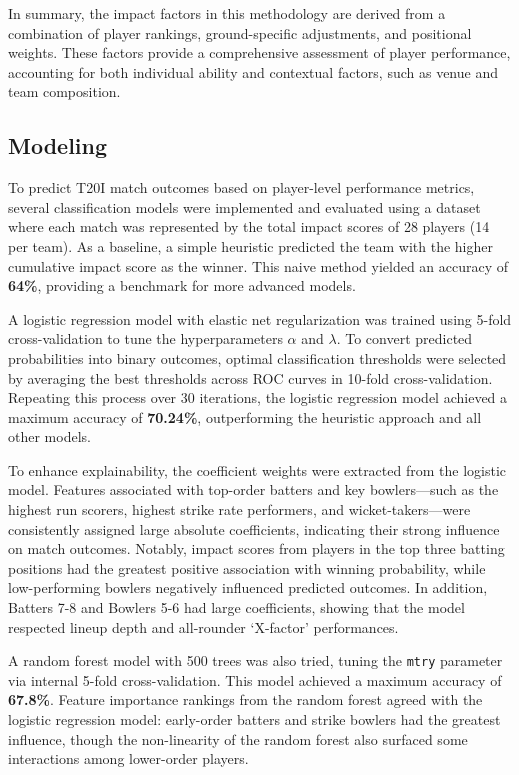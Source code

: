 \documentclass{article}[12pt]
\begin{document}
In summary, the impact factors in this methodology are derived from a combination of player rankings, ground-specific adjustments, and positional weights. These factors provide a comprehensive assessment of player performance, accounting for both individual ability and contextual factors, such as venue and team composition.

\subsection{Modeling}

To predict T20I match outcomes based on player-level performance metrics, several classification models were implemented and evaluated using a dataset where each match was represented by the total impact scores of 28 players (14 per team). As a baseline, a simple heuristic predicted the team with the higher cumulative impact score as the winner. This naive method yielded an accuracy of \textbf{64\%}, providing a benchmark for more advanced models.

A logistic regression model with elastic net regularization was trained using 5-fold cross-validation to tune the hyperparameters $\alpha$ and $\lambda$. \parencite{glmnet} To convert predicted probabilities into binary outcomes, optimal classification thresholds were selected by averaging the best thresholds across ROC curves in 10-fold cross-validation. \parencite{pROC_package} Repeating this process over 30 iterations, the logistic regression model achieved a maximum accuracy of \textbf{70.24\%}, outperforming the heuristic approach and all other models.

To enhance explainability, the coefficient weights were extracted from the logistic model. Features associated with top-order batters and key bowlers—such as the highest run scorers, highest strike rate performers, and wicket-takers—were consistently assigned large absolute coefficients, indicating their strong influence on match outcomes. Notably, impact scores from players in the top three batting positions had the greatest positive association with winning probability, while low-performing bowlers negatively influenced predicted outcomes. In addition, Batters 7-8 and Bowlers 5-6 had large coefficients, showing that the model respected lineup depth and all-rounder `X-factor' performances.

A random forest model with 500 trees was also tried, tuning the \texttt{mtry} parameter via internal 5-fold cross-validation. This model achieved a maximum accuracy of \textbf{67.8\%}. Feature importance rankings from the random forest agreed with the logistic regression model: early-order batters and strike bowlers had the greatest influence, though the non-linearity of the random forest also surfaced some interactions among lower-order players.
\end{document}
